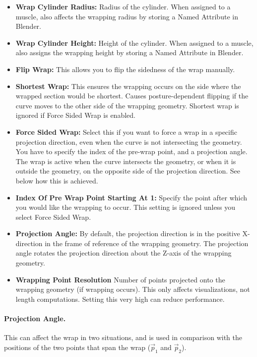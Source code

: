 \documentclass{article}
\begin{document}
\begin{itemize}
\item \textbf{Wrap Cylinder Radius:} Radius of the cylinder. When assigned to a muscle, also affects the wrapping radius by storing a Named Attribute in Blender.
\item \textbf{Wrap Cylinder Height:} Height of the cylinder. When assigned to a muscle, also assigns the wrapping height by storing a Named Attribute in Blender.
\item \textbf{Flip Wrap:} This allows you to flip the sidedness of the wrap manually.
\item \textbf{Shortest Wrap:} This ensures the wrapping occurs on the side where the wrapped section would be shortest. Causes posture-dependent flipping if the curve moves to the other side of the wrapping geometry. Shortest wrap is ignored if Force Sided Wrap is enabled.
\item \textbf{Force Sided Wrap:} Select this if you want to force a wrap in a specific projection direction, even when the curve is not intersecting the geometry. You have to specify the index of the pre-wrap point, and a projection angle. The wrap is active when the curve intersects the geometry, or when it is outside the geometry, on the opposite side of the projection direction. See below how this is achieved.
\item \textbf{Index Of Pre Wrap Point Starting At 1:} Specify the point after which you would like the wrapping to occur. This setting is ignored unless you select Force Sided Wrap.
\item \textbf{Projection Angle:} By default, the projection direction is in the positive X-direction in the frame of reference of the wrapping geometry. The projection angle rotates the projection direction about the Z-axis of the wrapping geometry.
\item \textbf{Wrapping Point Resolution} Number of points projected onto the wrapping geometry (if wrapping occurs). This only affects visualizations, not length computations. Setting this very high can reduce performance.
\end{itemize}


\paragraph{Projection Angle.} This can affect the wrap in two situations, and is used in comparison with the positions of the two points that span the wrap ($\vec{p}_{1}$ and $\vec{p}_{2}$).
\end{document}
